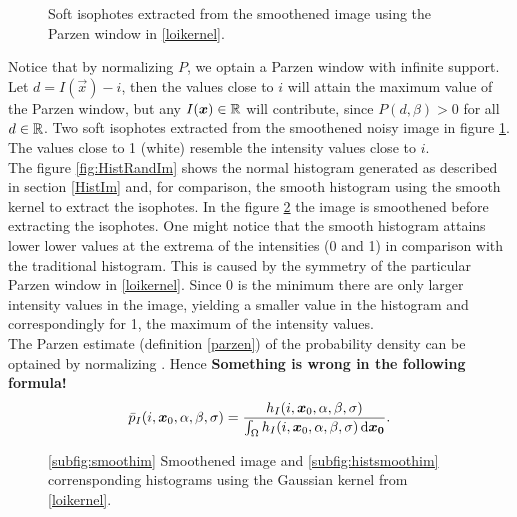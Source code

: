 \begin{figure}
  \centering
  \quad
  \caption{Soft isophotes extracted from the smoothened image using the Parzen window in \eqref{loikernel}.}\label{fig:SoftIso}
\end{figure}

Notice that by normalizing $P$, we optain a Parzen window with infinite support. Let $d=I(\vec{x})-i$, then the values close to $i$ will attain the maximum value of the Parzen window, but any $I(\boldsymbol{x} )\in \mathbb R$ will contribute, since $P(d,\beta)>0$ for all $d\in\mathbb R$. Two soft isophotes extracted from the smoothened noisy image in figure \ref{fig:SoftIso}. The values close to 1 (white) resemble the intensity values close to $i$.\\
The figure \ref{fig:HistRandIm} shows the normal histogram generated as described in section \ref{HistIm} and, for comparison, the smooth histogram using the smooth kernel to extract the isophotes. In the figure \ref{fig:HistSmoothRandIm} the image is smoothened before extracting the isophotes. One might notice that the smooth histogram attains lower lower values at the extrema of the intensities (0 and 1) in comparison with the traditional histogram. This is caused by the symmetry of the particular Parzen window in \eqref{loikernel}. Since 0 is the minimum there are only larger intensity values in the image, yielding a smaller value in the histogram and correspondingly for 1, the maximum of the intensity values.\\

The Parzen estimate (definition \ref{parzen}) of the probability density can be optained by normalizing \cite{dar.11}. Hence
\textbf{Something is wrong in the following formula!}
\begin{equation}
\bar{p}_I(i,\boldsymbol{x} _0,\alpha,\beta,\sigma) = \frac{h_I(i,\boldsymbol{x} _0,\alpha,\beta,\sigma)}{\int_\Omega h_I(i,\boldsymbol{x} _0,\alpha,\beta,\sigma)\,{\rm d} \boldsymbol{x_0} }.
\end{equation}

\begin{figure}
  \centering
  \quad
  \caption{\ref{subfig:smoothim} Smoothened image and \ref{subfig:histsmoothim} corrensponding histograms using the Gaussian kernel from \eqref{loikernel}.}\label{fig:HistSmoothRandIm}
\end{figure}

